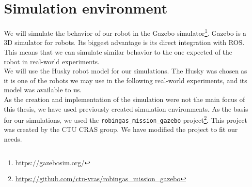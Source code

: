 \section{Simulation environment}
    We will simulate the behavior of our robot in the Gazebo simulator\footnote{\url{https://gazebosim.org/}}. Gazebo is a 3D simulator for robots. Its biggest advantage is its direct integration with ROS. This means that we can simulate similar behavior to the one expected of the robot in real-world experiments.\\
    We will use the Husky robot model for our simulations. The Husky was chosen as it is one of the robots we may use in the following real-world experiments, and its model was available to us.\\
    As the creation and implementation of the simulation were not the main focus of this thesis, we have used previously created simulation environments. As the basis for our simulations, we used the \texttt{robingas\_mission\_gazebo} project\footnote{\url{https://github.com/ctu-vras/robingas_mission_gazebo}}. This project was created by the CTU CRAS group. We have modified the project to fit our needs.

